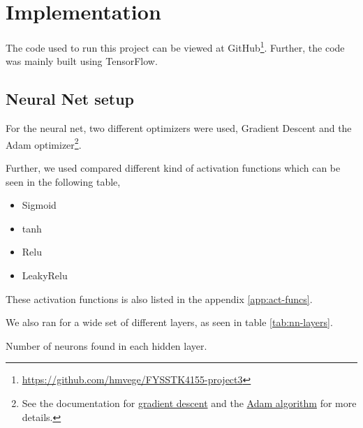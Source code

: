 \section{Implementation}
The code used to run this project can be viewed at GitHub\footnote{\url{https://github.com/hmvege/FYSSTK4155-project3}}. Further, the code was mainly built using TensorFlow\cite{tensorflow2015-whitepaper}.

\subsection{Neural Net setup}
For the neural net, two different optimizers were used, Gradient Descent and the Adam optimizer\footnote{See the documentation for \href{https://www.tensorflow.org/api_docs/python/tf/train/GradientDescentOptimizer}{gradient descent} and the \href{https://www.tensorflow.org/api_docs/python/tf/train/AdamOptimizer}{Adam algorithm}\cite{kingma_adam:_2014} for more details.}. 

Further, we used compared different kind of activation functions which can be seen in the following table,
\begin{itemize}
    \item Sigmoid
    \item tanh
    \item Relu
    \item LeakyRelu
\end{itemize}
These activation functions is also listed in the appendix \ref{app:act-funcs}.

We also ran for a wide set of different layers, as seen in table \ref{tab:nn-layers}. 
\begin{table}[h!tb]
    \centering
    \caption{Number of neurons found in each hidden layer.}
    \label{tab:nn-layers}
\end{table}